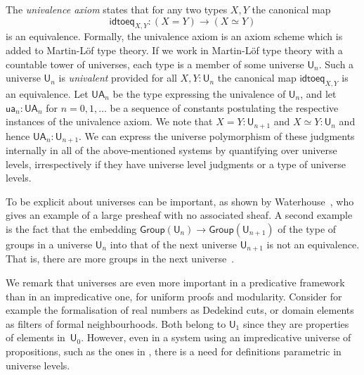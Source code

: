 \documentclass[11pt,a4paper]{article}
\theoremstyle{definition}
\newcommand{\UU}{\mathsf{U}}
\newcommand{\Level}{\mathsf{level}}
\newcommand{\Group}{\mathsf{Group}}
\newcommand{\idtoeq}{\mathsf{idtoeq}}
\newcommand{\ua}{\mathsf{ua}}
\newcommand{\UA}{\mathsf{UA}}
\begin{document}
The \emph{univalence axiom} states that for any two types $X,Y$ the canonical map
$$
\idtoeq_{X,Y} : (X=Y)\to (X\simeq Y)
$$
is an equivalence.
Formally, the univalence axiom is an axiom scheme which is added to
Martin-Löf type theory.
If we work in Martin-Löf type theory with a countable tower of universes,
each type is a member of some universe $\UU_n$.
Such a universe $\UU_n$ is {\em univalent} provided for all $X,Y : \UU_n$ the
canonical map $\idtoeq_{X,Y}$ is an equivalence.
Let $\UA_n$ be the type expressing the univalence of $\UU_n$, and let
$\ua_n : \UA_n$ for $n = 0,1,\ldots$ be a sequence of constants postulating
the respective instances of the univalence axiom.
We note that $X = Y : \UU_{n+1}$ and $X\simeq Y : \UU_n$ and
hence $\UA_n : \UU_{n+1}$. We can express the universe polymorphism of these judgments internally in all of the above-mentioned systems by quantifying over universe levels, irrespectively if they have universe level judgments or a type of universe levels.

To be explicit about universes can be important, as shown by Waterhouse~\cite{waterhouse:sheaves,chambert-loir:universes-matter}, who gives an example of a large presheaf with no associated sheaf. A second example is the fact that the embedding
 $\Group(\UU_n)\rightarrow \Group(\UU_{n+1})$ of the type of groups in a universe $\UU_n$ into that of the next universe $\UU_{n+1}$ is not an equivalence. That is, there are more groups in the next universe~\cite{bcde:largegroup}.

 We remark that universes are even more important in a predicative framework
than in an impredicative one, for uniform proofs and modularity.
Consider for example the formalisation of real numbers as Dedekind cuts,
or domain elements as filters of formal neighbourhoods. Both belong to $\UU_1$ since they are properties of elements in~$\UU_0$.
However, even in a system using an impredicative universe of propositions,
such as the ones in \cite{Huet87,moura:lean}, there is a need for
definitions parametric in universe levels.



\end{document}
